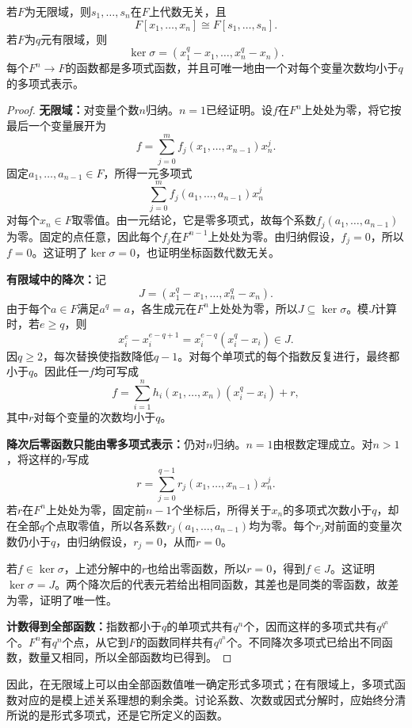 \begin{theorem}\label{p2:poly-functions-many}
若$F$为无限域，则$s_1,\ldots,s_n$在$F$上代数无关，且
\[
F[x_1,\ldots,x_n]\cong F[s_1,\ldots,s_n].
\]
若$F$为$q$元有限域，则
\[
\ker\sigma=(x_1^q-x_1,\ldots,x_n^q-x_n).
\]
每个$F^n\to F$的函数都是多项式函数，并且可唯一地由一个对每个变量次数均小于$q$的多项式表示。
\end{theorem}
\begin{proof}
\textbf{无限域：}对变量个数$n$归纳。$n=1$已经证明。设$f$在$F^n$上处处为零，将它按最后一个变量展开为
\[
f=\sum_{j=0}^m f_j(x_1,\ldots,x_{n-1})x_n^j.
\]
固定$a_1,\ldots,a_{n-1}\in F$，所得一元多项式
\[
\sum_{j=0}^m f_j(a_1,\ldots,a_{n-1})x_n^j
\]
对每个$x_n\in F$取零值。由一元结论，它是零多项式，故每个系数$f_j(a_1,\ldots,a_{n-1})$为零。固定的点任意，因此每个$f_j$在$F^{n-1}$上处处为零。由归纳假设，$f_j=0$，所以$f=0$。这证明了$\ker\sigma=0$，也证明坐标函数代数无关。

\textbf{有限域中的降次：}记
\[
J=(x_1^q-x_1,\ldots,x_n^q-x_n).
\]
由于每个$a\in F$满足$a^q=a$，各生成元在$F^n$上处处为零，所以$J\subseteq\ker\sigma$。模$J$计算时，若$e\ge q$，则
\[
x_i^e-x_i^{e-q+1}=x_i^{e-q}(x_i^q-x_i)\in J.
\]
因$q\ge2$，每次替换使指数降低$q-1$。对每个单项式的每个指数反复进行，最终都小于$q$。因此任一$f$均可写成
\[
f=\sum_{i=1}^n h_i(x_1,\ldots,x_n)(x_i^q-x_i)+r,
\]
其中$r$对每个变量的次数均小于$q$。

\textbf{降次后零函数只能由零多项式表示：}仍对$n$归纳。$n=1$由根数定理成立。对$n>1$，将这样的$r$写成
\[
r=\sum_{j=0}^{q-1}r_j(x_1,\ldots,x_{n-1})x_n^j.
\]
若$r$在$F^n$上处处为零，固定前$n-1$个坐标后，所得关于$x_n$的多项式次数小于$q$，却在全部$q$个点取零值，所以各系数$r_j(a_1,\ldots,a_{n-1})$均为零。每个$r_j$对前面的变量次数仍小于$q$，由归纳假设，$r_j=0$，从而$r=0$。

若$f\in\ker\sigma$，上述分解中的$r$也给出零函数，所以$r=0$，得到$f\in J$。这证明$\ker\sigma=J$。两个降次后的代表元若给出相同函数，其差也是同类的零函数，故差为零，证明了唯一性。

\textbf{计数得到全部函数：}指数都小于$q$的单项式共有$q^n$个，因而这样的多项式共有$q^{q^n}$个。$F^n$有$q^n$个点，从它到$F$的函数同样共有$q^{q^n}$个。不同降次多项式已给出不同函数，数量又相同，所以全部函数均已得到。
\end{proof}

因此，在无限域上可以由全部函数值唯一确定形式多项式；在有限域上，多项式函数对应的是模上述关系理想的剩余类。讨论系数、次数或因式分解时，应始终分清所说的是形式多项式，还是它所定义的函数。
